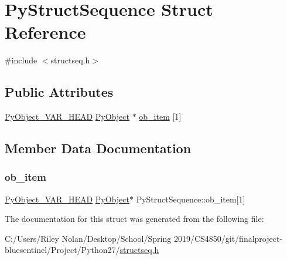 \hypertarget{struct_py_struct_sequence}{}\section{Py\+Struct\+Sequence Struct Reference}
\label{struct_py_struct_sequence}


{\ttfamily \#include $<$structseq.\+h$>$}

\subsection*{Public Attributes}
\begin{DoxyCompactItemize}
\item 
\mbox{\hyperlink{_python27_2object_8h_aa0eba161a76be8710b3de325c2e7f9e2}{Py\+Object\+\_\+\+V\+A\+R\+\_\+\+H\+E\+AD}} \mbox{\hyperlink{_python27_2object_8h_aadc84ac7aed2cfa6f20c25f62bf3dac7}{Py\+Object}} $\ast$ \mbox{\hyperlink{struct_py_struct_sequence_a35f9790f4d2b35fb3e148ce87a6b710c}{ob\+\_\+item}} \mbox{[}1\mbox{]}
\end{DoxyCompactItemize}


\subsection{Member Data Documentation}
\mbox{\label{struct_py_struct_sequence_a35f9790f4d2b35fb3e148ce87a6b710c}} 
\subsubsection{\texorpdfstring{ob\_item}{ob\_item}}
{\footnotesize\ttfamily \mbox{\hyperlink{_python27_2object_8h_aa0eba161a76be8710b3de325c2e7f9e2}{Py\+Object\+\_\+\+V\+A\+R\+\_\+\+H\+E\+AD}} \mbox{\hyperlink{_python27_2object_8h_aadc84ac7aed2cfa6f20c25f62bf3dac7}{Py\+Object}}$\ast$ Py\+Struct\+Sequence\+::ob\+\_\+item\mbox{[}1\mbox{]}}



The documentation for this struct was generated from the following file\+:\begin{DoxyCompactItemize}
\item 
C\+:/\+Users/\+Riley Nolan/\+Desktop/\+School/\+Spring 2019/\+C\+S4850/git/finalproject-\/bluesentinel/\+Project/\+Python27/\mbox{\hyperlink{structseq_8h}{structseq.\+h}}\end{DoxyCompactItemize}
